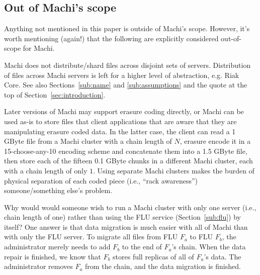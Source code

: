 \documentclass[preprint,10pt]{sigplanconf}
\begin{document}


\subsection{Out of Machi's scope}

Anything not mentioned in this paper is outside of Machi's scope.
However, it's worth mentioning (again!) that the following are explicitly
considered out-of-scope for Machi.

  Machi does not distribute/shard files across disjoint sets of servers.
  Distribution of files across Machi servers is left for a higher
  level of abstraction, e.g. Riak Core.  See also
  Sections~\ref{sub:name} and \ref{sub:assumptions} and the quote at
  the top of Section~\ref{sec:introduction}.

  Later versions of Machi may support erasure
  coding directly, or Machi can be used as-is to store files that
  client applications that are aware that they are manipulating
  erasure coded data.  In the latter case,
  the client can read a 1 GByte file from a Machi cluster with a chain
  length of $N$, erasure encode it in a
  15-choose-any-10 encoding scheme and concatenate them into a 1.5 GByte file,
  then store each of the fifteen
  0.1 GByte chunks in a different Machi cluster, each with a chain
  length of only $1$.  Using separate Machi clusters makes the
  burden of physical separation of each coded piece (i.e., ``rack
  awareness'') someone/something else's problem.

Why would would someone wish to run a Machi cluster with only one
server (i.e., chain length of one) rather than using the FLU service
(Section~\ref{sub:flu}) by itself?  One answer is that data
migration is much easier with all of Machi than with only the FLU
server.  To migrate all files from FLU $F_a$ to FLU $F_b$, the administrator
merely needs to add $F_b$ to the end of $F_a$'s chain.  When the data
repair is finished, we know that $F_b$ stores full replicas of all of
$F_a$'s data.  The administrator removes $F_a$ from the chain, and the
data migration is finished.
\end{document}
